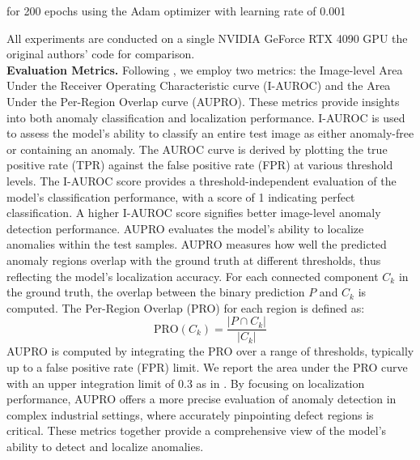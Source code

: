 \DIFaddend for 200 epochs using the Adam optimizer \cite{kingma2014adam} with \DIFdelbegin {}\DIFdelend \DIFaddbegin {}\DIFaddend learning rate of 0.001 \DIFdelbegin {}\DIFdelend \DIFaddbegin {}

\DIFaddend All experiments are conducted on a single NVIDIA GeForce RTX 4090 GPU \DIFdelbegin {}\DIFdelend \DIFaddbegin {}\DIFaddend the original authors' code for \DIFaddbegin {}\DIFaddend comparison. \\

\noindent \textbf{Evaluation Metrics.} Following \cite{bergmann2022mvtec, wang2023multimodal}, we employ two metrics: the Image-level Area Under the Receiver Operating Characteristic curve (I-AUROC) and the Area Under the Per-Region Overlap curve (AUPRO). These metrics provide insights into both anomaly classification and localization performance. I-AUROC is used to assess the model's ability to classify an entire test image as either anomaly-free or containing an anomaly. The AUROC curve is derived by plotting the true positive rate (TPR) against the false positive rate (FPR) at various threshold levels. The I-AUROC score provides a threshold-independent evaluation of the model's classification performance, with a score of 1 indicating perfect classification. A higher I-AUROC score signifies better image-level anomaly detection performance. AUPRO evaluates the model's ability to localize anomalies within the test samples. AUPRO measures how well the predicted anomaly regions overlap with the ground truth at different thresholds, thus reflecting the model's localization accuracy. For each connected component \( C_k \) in the ground truth, the overlap between the binary prediction \( P \) and \( C_k \) is computed. The Per-Region Overlap (PRO) for each region is defined as:
\begin{equation}
    \text{PRO}(C_k) = \frac{|P \cap C_k|}{|C_k|}
\end{equation}
AUPRO is computed by integrating the PRO over a range of thresholds, typically up to a false positive rate (FPR) limit.  We report the area under the PRO curve with an upper integration limit of 0.3 as in \cite{bergmann2022mvtec}. By focusing on localization performance, AUPRO offers a more precise evaluation of anomaly detection in complex industrial settings, where accurately pinpointing defect regions is critical. These metrics together provide a comprehensive view of the model's ability to detect and localize anomalies.

